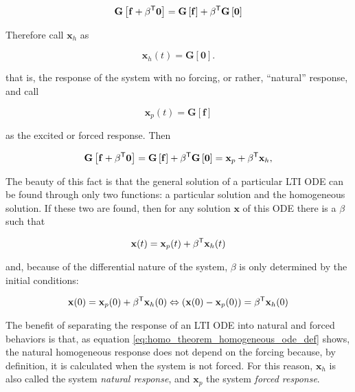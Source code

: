 \begin{equation} \mathbf{G}\left[\mathbf{f} + \beta^{\mathsf{T}}\mathbf{0}\right] = \mathbf{G}\left[\mathbf{f}\right] + \beta^{\mathsf{T}} \mathbf{G}\left[\mathbf{0}\right] \end{equation}

	Therefore call $\mathbf{x}_h$ as 

\begin{equation} \mathbf{x}_h(t) = \mathbf{G}\left[\mathbf{0}\right]. \end{equation}

	\noindent that is, the response of the system with no forcing, or rather, ``natural'' response, and call

\begin{equation} \mathbf{x}_p(t) = \mathbf{G}\left[\mathbf{f}\right] \end{equation}

	\noindent as the excited or forced response. Then

\begin{equation} \mathbf{G}\left[\mathbf{f} + \beta^{\mathsf{T}}\mathbf{0}\right] = \mathbf{G}\left[\mathbf{f}\right] + \beta^{\mathsf{T}}\mathbf{G}\left[\mathbf{0}\right] = \mathbf{x}_p +\beta^{\mathsf{T}}\mathbf{x}_h , \end{equation}

	The beauty of this fact is that the general solution of a particular LTI ODE can be found through only two functions: a particular solution and the homogeneous solution. If these two are found, then for any solution $\mathbf{x}$ of this ODE there is a $\beta$ such that

\begin{equation} \mathbf{x}(t) = \mathbf{x}_p(t) + \beta^{\mathsf{T}}\mathbf{x}_h(t) \end{equation}

	\noindent and, because of the differential nature of the system, $\beta$ is only determined by the initial conditions:

\begin{equation} \mathbf{x}(0) = \mathbf{x}_p(0) + \beta^{\mathsf{T}}\mathbf{x}_h(0) \Leftrightarrow \left(\mathbf{x}(0) - \mathbf{x}_p(0)\right) = \beta^{\mathsf{T}}\mathbf{x}_h(0) \end{equation}

	The benefit of separating the response of an LTI ODE into natural and forced behaviors is that, as equation \eqref{eq:homo_theorem_homogeneous_ode_def} shows, the natural homogeneous response does not depend on the forcing because, by definition, it is calculated when the system is not forced. For this reason, $\mathbf{x}_h$ is also called the system \textit{natural response}, and $\mathbf{x}_p$ the system \textit{forced response}.

